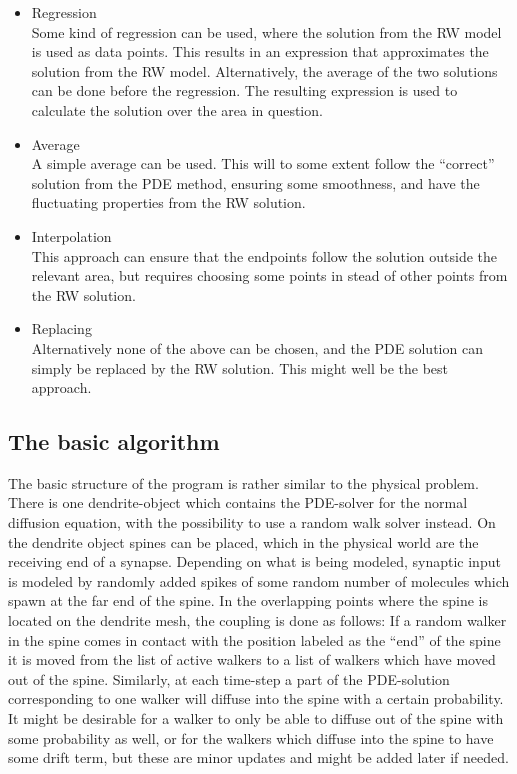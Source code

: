 
\begin{itemize}
 \item Regression\\
 Some kind of regression can be used, where the solution from the RW model is used as data points. 
 This results in an expression that approximates the solution from the RW model. 
 Alternatively, the average of the two solutions can be done before the regression. 
 The resulting expression is used to calculate the solution over the area in question.
 \item Average\\
 A simple average can be used. This will to some extent follow the ``correct'' solution from the PDE method, ensuring some smoothness, and have the fluctuating properties from the RW solution.
 \item Interpolation\\
 This approach can ensure that the endpoints follow the solution outside the relevant area, but requires choosing some points in stead of other points from the RW solution. 
 \item Replacing\\
 Alternatively none of the above can be chosen, and the PDE solution can simply be replaced by the RW solution. This might well be the best approach.
\end{itemize}


\subsection{The basic algorithm}\label{basic_algorithm}

The basic structure of the program is rather similar to the physical problem.
There is one dendrite-object which contains the PDE-solver for the normal diffusion equation, with the possibility to use a random walk solver instead. 
On the dendrite object spines can be placed, which in the physical world are the receiving end of a synapse. 
Depending on what is being modeled, synaptic input is modeled by randomly added spikes of some random number of molecules which spawn at the far end of the spine. 
In the overlapping points where the spine is located on the dendrite mesh, the coupling is done as follows: 
If a random walker in the spine comes in contact with the position labeled as the ``end'' of the spine it is moved from the list of active walkers to a list of walkers which have moved out of the spine. 
Similarly, at each time-step a part of the PDE-solution corresponding to one walker will diffuse into the spine with a certain probability. 
It might be desirable for a walker to only be able to diffuse out of the spine with some probability as well, or for the walkers which diffuse into the spine to have some drift term, but these are minor updates and might be added later if needed. \\

